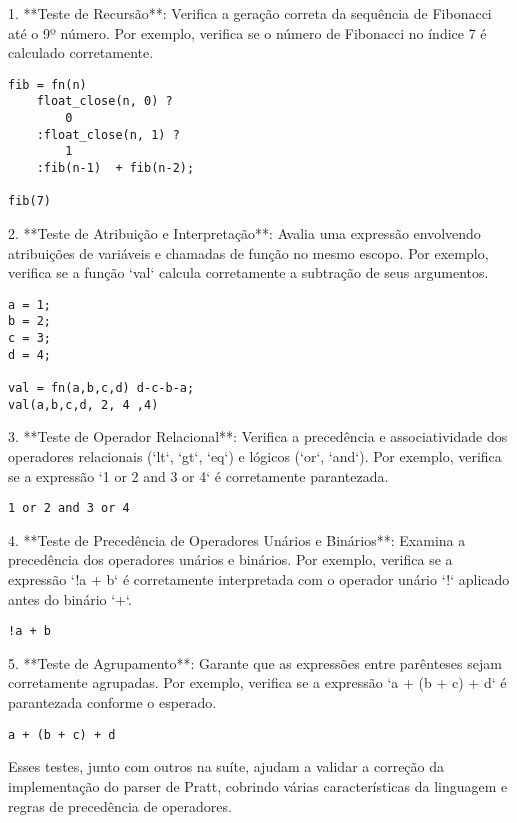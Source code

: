 
1. **Teste de Recursão**: Verifica a geração correta da sequência de Fibonacci até o 9º número. Por exemplo, verifica se o número de Fibonacci no índice 7 é calculado corretamente.

\begin{verbatim}
fib = fn(n)  
    float_close(n, 0) ? 
        0
    :float_close(n, 1) ?
        1
    :fib(n-1)  + fib(n-2);

fib(7)
\end{verbatim}

2. **Teste de Atribuição e Interpretação**: Avalia uma expressão envolvendo atribuições de variáveis e chamadas de função no mesmo escopo. Por exemplo, verifica se a função `val` calcula corretamente a subtração de seus argumentos.

\begin{verbatim}
a = 1;
b = 2;
c = 3;
d = 4;

val = fn(a,b,c,d) d-c-b-a; 
val(a,b,c,d, 2, 4 ,4)
\end{verbatim}

3. **Teste de Operador Relacional**: Verifica a precedência e associatividade dos operadores relacionais (`lt`, `gt`, `eq`) e lógicos (`or`, `and`). Por exemplo, verifica se a expressão `1 or 2 and 3 or 4` é corretamente parantezada.

\begin{verbatim}
1 or 2 and 3 or 4
\end{verbatim}

4. **Teste de Precedência de Operadores Unários e Binários**: Examina a precedência dos operadores unários e binários. Por exemplo, verifica se a expressão `!a + b` é corretamente interpretada com o operador unário `!` aplicado antes do binário `+`.

\begin{verbatim}
!a + b
\end{verbatim}

5. **Teste de Agrupamento**: Garante que as expressões entre parênteses sejam corretamente agrupadas. Por exemplo, verifica se a expressão `a + (b + c) + d` é parantezada conforme o esperado.

\begin{verbatim}
a + (b + c) + d
\end{verbatim}

Esses testes, junto com outros na suíte, ajudam a validar a correção da implementação do parser de Pratt, cobrindo várias características da linguagem e regras de precedência de operadores.

